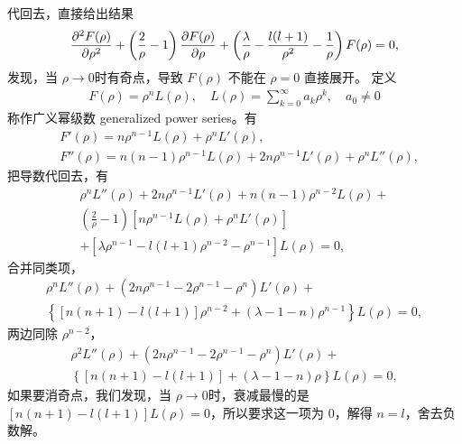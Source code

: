 代回去，直接给出结果
\begin{align}
    \pdv[2]{F(\rho)}{\rho} + \left(\frac2\rho -1\right) \pdv{F(\rho)}{\rho} + \left(
        \frac\lambda\rho - \frac{l(l+1)}{\rho^2} - \frac1\rho
    \right) F(\rho) = 0,
\end{align}
发现，当 $\rho\rightarrow 0$时有奇点，导致 $F(\rho)$ 不能在 $\rho = 0$ 直接展开。
定义
\begin{align}
    F(\rho) = \rho^n L(\rho), \quad L(\rho) = \sum_{k=0}^\infty a_k \rho^k, \quad a_0\neq0
\end{align}
称作广义幂级数 generalized power series。有
\begin{align}
    &F'(\rho) = n\rho^{n-1} L(\rho) + \rho^n L'(\rho), \\
    &F''(\rho) = n(n-1) \rho^{n-1} L(\rho) + 2n\rho^{n-1} L'(\rho) 
    + \rho^n L''(\rho),
\end{align}
把导数代回去，有
\begin{multline}
    \rho^n L ''(\rho) + 2n \rho^{n-1} L'(\rho) + n(n-1) \rho^{n-2} L(\rho) + \\
    \left(\frac2\rho -1\right)
    \left[
        n\rho^{n-1} L(\rho) + \rho^n L'(\rho)
    \right]\\
    + \left[
        \lambda \rho^{n-1} - l(l+1) \rho^{n-2} - \rho^{n-1}
    \right] L(\rho) = 0,
\end{multline}
合并同类项，
\begin{multline}
    \rho ^n L''(\rho) +( 2n \rho^{n-1} - 2\rho^{n-1} - \rho^n) L'(\rho) + \\
    \left\{
    [n(n+1) - l (l+1)] \rho^{n-2} + (\lambda - 1-n) \rho^{n-1}
    \right\} L(\rho) = 0,
\end{multline}
两边同除 $\rho^{n-2}$，
\begin{multline}
    \rho ^2 L''(\rho) +( 2n \rho^{n-1} - 2\rho^{n-1} - \rho^n) L'(\rho) + \\
    \left\{
    [n(n+1) - l (l+1)] + (\lambda - 1-n)\rho
    \right\} L(\rho) = 0,
\end{multline}
如果要消奇点，我们发现，当 $\rho \rightarrow 0$时，衰减最慢的是 $[n(n+1) - l (l+1)] L(\rho) = 0$，所以要求这一项为 0，解得 $n=l$，舍去负数解。

